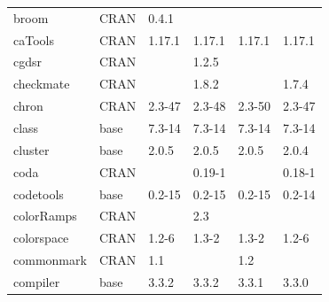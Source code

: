 \begin{longtable}{llllll}
\rowcolor{black!10}
broom                         & \acrshort{CRAN}                      & 0.4.1       &             &                &                   \\
\rowcolor{black!5}
caTools                       & \acrshort{CRAN}                      & 1.17.1      & 1.17.1      & 1.17.1         & 1.17.1             \\
\rowcolor{black!10}
cgdsr                         & \acrshort{CRAN}                      &             & 1.2.5       &                &                   \\
\rowcolor{black!5}
checkmate                     & \acrshort{CRAN}                      &             & 1.8.2       &                & 1.7.4              \\
\rowcolor{black!10}
chron                         & \acrshort{CRAN}                      & 2.3-47      & 2.3-48      & 2.3-50         & 2.3-47            \\
\rowcolor{black!5}
class                         & base                      & 7.3-14      & 7.3-14      & 7.3-14         & 7.3-14             \\
\rowcolor{black!10}
cluster                       & base                      & 2.0.5       & 2.0.5       & 2.0.5          & 2.0.4             \\
\rowcolor{black!5}
coda                          & \acrshort{CRAN}                      &             & 0.19-1      &                & 0.18-1             \\
\rowcolor{black!10}
codetools                     & base                      & 0.2-15      & 0.2-15      & 0.2-15         & 0.2-14            \\
\rowcolor{black!5}
colorRamps                    & \acrshort{CRAN}                      &             & 2.3         &                &                    \\
\rowcolor{black!10}
colorspace                    & \acrshort{CRAN}                      & 1.2-6       & 1.3-2       & 1.3-2          & 1.2-6             \\
\rowcolor{black!5}
commonmark                    & \acrshort{CRAN}                      & 1.1         &             & 1.2            &                    \\
\rowcolor{black!10}
compiler                      & base                      & 3.3.2       & 3.3.2       & 3.3.1          & 3.3.0             \\

\end{longtable}
